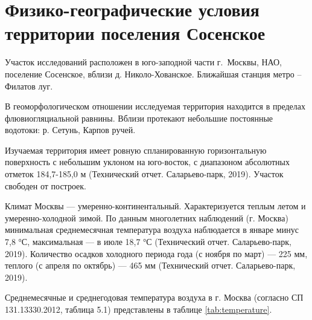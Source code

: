 \chapter{Физико-географические условия территории поселения Сосенское}\label{ch:ch1}
 
Участок исследований расположен в юго-заподной части г.~Москвы, НАО, поселение Сосенское, 
вблизи д. Николо-Хованское. Ближайшая станция метро – Филатов луг.

В геоморфологическом отношении исследуемая территория находится в пределах флювиогляциальной равнины. 
Вблизи протекают небольшие постоянные водотоки: р. Сетунь, Карпов ручей.

Изучаемая территория имеет ровную спланированную горизонтальную поверхность с небольшим уклоном на юго-восток, 
с диапазоном абсолютных отметок 184,7-185,0 м (Технический отчет. Саларьево-парк, 2019). Участок свободен от построек.

Климат Москвы — умеренно-континентальный. 
Характеризуется теплым летом и умеренно-холодной зимой.
По данным многолетних наблюдений (г. Москва) минимальная среднемесячная температура воздуха 
наблюдается в январе минус 7,8 °С, максимальная — в июле 18,7 °С (Технический отчет. Саларьево-парк, 2019). 
Количество осадков холодного периода года (с ноября по март) — 225 мм, теплого 
(с апреля по октябрь) — 465 мм (Технический отчет. Саларьево-парк, 2019). 

Среднемесячные и среднегодовая температура воздуха в г. Москва (согласно СП 131.13330.2012, таблица 5.1) 
представлены в таблице \ref{tab:temperature}.


